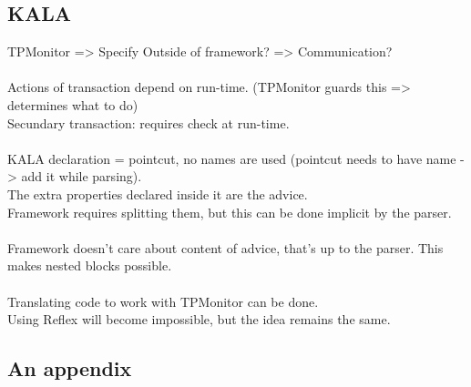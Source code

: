 \documentclass[a4paper]{report}
\begin{document}
\section{KALA}
TPMonitor => Specify Outside of framework? => Communication?\\
\\
Actions of transaction depend on run-time. (TPMonitor guards this => determines what to do)\\
Secundary transaction: requires check at run-time.\\
\\
KALA declaration = pointcut, no names are used (pointcut needs to have name -> add it while parsing).\\
The extra properties declared inside it are the advice.\\
Framework requires splitting them, but this can be done implicit by the parser.\\
\\
Framework doesn't care about content of advice, that's up to the parser. This makes nested blocks possible.\\
\\
Translating code to work with TPMonitor can be done.\\
Using Reflex will become impossible, but the idea remains the same.\\

\backpages
\begin{appendices}
\chapter{An appendix}
\label{chapt:appendix}

\end{appendices}


\end{document}
